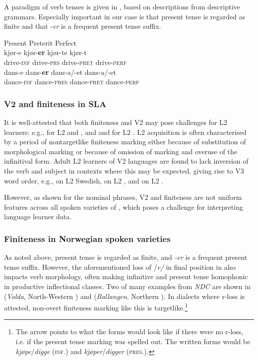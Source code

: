\documentclass[output=paper,colorlinks,citecolor=brown,modfonts,nonflat]{../langscibook}
\begin{document}
A paradigm of  verb tenses is given in , based on descriptions from descriptive grammars. Especially important in our case is that present tense is regarded as finite and that -\textit{er} is a frequent present tense suffix.  


\ea%
    \label{ex:emilsen:10}
 {Present} {Preterit} {Perfect}  \\
 kjør-e kjør-\textbf{er} kjør-te kjør-t  \\
 drive-\textsc{inf}  drive-\textsc{prs}  drive-\textsc{pret} drive-\textsc{perf}  \\
  dans-e dans-\textbf{er} dans-a/-et dans-a/-et  \\
 dance-\textsc{inf}  dance-\textsc{pres}  dance-\textsc{pret} dance-\textsc{perf}  \\
\z

\subsubsection{V2 and finiteness in SLA}%

It is well-attested that both finiteness and V2 may pose challenges for L2 learners: e.g., \citet{PrévostWhite2000} for L2  and , and \citet{Hagen2001, Hagen2005, Mosfjeld2017} and \citet{GujordEtAl2018} for L2 . L2 acquisition is often characterised by a period of nontargetlike finiteness marking either because of substitution of morphological marking or because of omission of marking and overuse of the infinitival form. Adult L2 learners of V2 languages are found to lack inversion of the verb and subject in contexts where this may be expected, giving rise to V3 word order, e.g., \citet{Bohnacker2010} on L2 Swedish, \citet{Bohnacker2006} on L2 , and \citet{Mosfjeld2017} on L2 . 

However, as shown for the nominal phrases, V2 and finiteness are not uniform features across all spoken varieties of , which poses a challenge for interpreting language learner data. 

\subsubsection{Finiteness in Norwegian spoken varieties}%

As noted above, present tense is regarded as finite, and \textit{{}-er} is a frequent present tense suffix. However, the aforementioned loss of /\textit{r/} in final position in  also impacts verb morphology, often making infinitive and present tense homophonic in productive inflectional classes. Two of many examples from \textit{NDC} are shown in  (\textit{Volda}, North-Western ) and  (\textit{Ballangen}, North\-ern ). In dialects where r-loss is attested, non-overt finiteness marking like this is targetlike.\footnote{{The arrow points to what the forms would look like if there were no r-loss, i.e. if the present tense marking was spelled out. The written  forms would be} {\textit{kjøpe}}{/}{\textit{digge}} {(\textsc{inf}.) and} {\textit{kjøper}}{/}{\textit{digger}} {(\textsc{pres}.).}}
\end{document}
